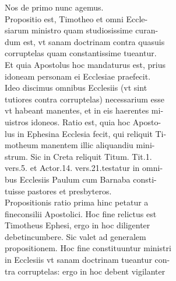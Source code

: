 \documentclass{article}
\begin{document}
\begin{pages}
                Nos de primo nunc agemus. \\
                Propositio est, Timotheo et omni Eccle- \\
                siarum ministro quam studiosissime curan- \\
                dum est, vt sanam doctrinam contra quasuis \\
                corruptelas quam constantissime tueantur. \\
                Et quia Apostolus hoc mandaturus est, prius \\
                idoneam personam ei Ecclesiae praefecit. \\
                Ideo discimus omnibus Ecclesiis (vt sint \\
                tutiores contra corruptelas) necessarium esse \\
                vt habeant manentes, et in eis haerentes mi- \\
                uistros idoneos. Ratio est, quia hoc Aposto- \\
                lus in Ephesina Ecclesia fecit, qui reliquit Ti- \\
                motheum manentem illic aliquandiu mini- \\
                strum. Sic in Creta reliquit Titum. Tit.1. \\
                vers.5. et Actor.14. vers.21.testatur in omni- \\
                bus Ecclesiis Paulum cum Barnaba consti- \\
                tuisse pastores et presbyteros. \\
                Propositionis ratio prima hinc petatur a \\
                fineconsilii Apostolici. Hoc fine relictus est \\
                Timotheus Ephesi, ergo in hoc diligenter \\
                debetincumbere. Sic valet ad generalem \\
                propositionem. Hoc fine constituuntur ministri \\
                in Ecclesiis vt sanam doctrinam tueantur con- \\
                tra corruptelas: ergo in hoc debent vigilanter \\

\end{pages}
\end{document}

